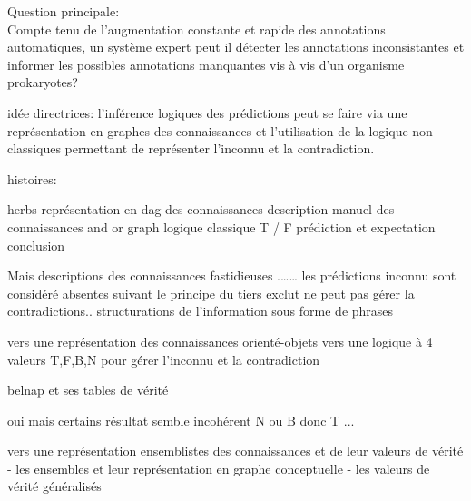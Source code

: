 Question principale:\\
Compte tenu de l'augmentation constante et rapide des annotations automatiques, un système expert peut il détecter les annotations inconsistantes et informer les possibles annotations manquantes vis à vis d'un organisme prokaryotes? 

idée directrices:
l'inférence logiques des prédictions peut se faire via une représentation en graphes des connaissances et l'utilisation de la logique non classiques permettant de représenter l'inconnu et la contradiction.

histoires:

herbs
   représentation en dag des connaissances
   description manuel des connaissances
   and or graph 
   logique classique T / F
   prédiction et expectation
   conclusion
   
Mais descriptions des connaissances fastidieuses .…… 
les prédictions inconnu sont considéré absentes suivant le principe du tiers exclut
ne peut pas gérer la contradictions..
structurations de l'information sous forme de phrases

vers une représentation des connaissances orienté-objets
vers une logique à 4 valeurs T,F,B,N pour gérer l'inconnu et la contradiction

belnap et ses tables de vérité

oui mais certains résultat semble incohérent  N ou B donc T ...

vers une représentation ensemblistes des connaissances et de leur valeurs de vérité
  - les ensembles et leur représentation en graphe conceptuelle
  - les valeurs de vérité généralisés

